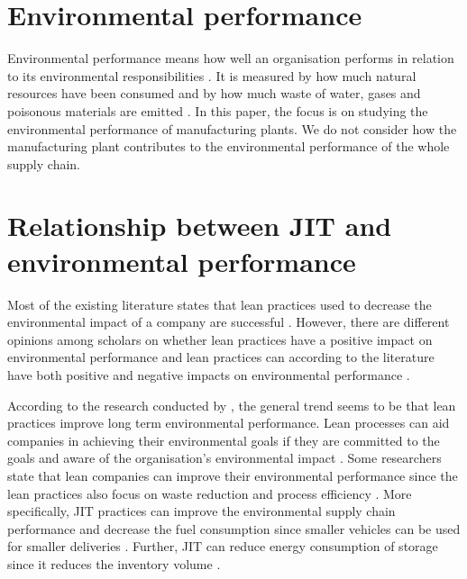 \section{Environmental performance}
Environmental performance means how well an organisation performs in relation to its environmental responsibilities \citep{mollenkopfGreenLeanGlobal2010}. 
It is measured by how much natural resources have been consumed and by how much waste of water, gases and poisonous materials are emitted \citep{maoLowCarbonSupply2017}. 
In this paper, the focus is on studying the environmental performance of manufacturing plants. 
We do not consider how the manufacturing plant contributes to the environmental performance of the whole supply chain. 


\section{Relationship between JIT and environmental performance}
Most of the existing literature states that lean practices used to decrease the environmental impact of a company are successful \citep{diesteEvaluatingImpactLean2020}. 
However, there are different opinions among scholars on whether lean practices have a positive impact on environmental performance and lean practices can according to the literature have both positive and negative impacts on environmental performance \citep{diesteEvaluatingImpactLean2020}.

According to the research conducted by \citep{diesteEvaluatingImpactLean2020}, the general trend seems to be that lean practices improve long term environmental performance. 
Lean processes can aid companies in achieving their environmental goals if they are committed to the goals and aware of the organisation’s environmental impact \citep{diesteEvaluatingImpactLean2020}. 
Some researchers state that lean companies can improve their environmental performance since the lean practices also focus on waste reduction and process efficiency \citep{diesteEvaluatingImpactLean2020}. 
More specifically, JIT practices can improve the environmental supply chain performance \citep{cherrafiLeanGreenPractices2018, diesteEvaluatingImpactLean2020} and decrease the fuel consumption since smaller vehicles can be used for smaller deliveries \citep{garza-reyesLeanGreenTransport2016}. 
Further, JIT can reduce energy consumption of storage since it reduces the inventory volume \citep{garza-reyesEffectLeanMethods2018}.

